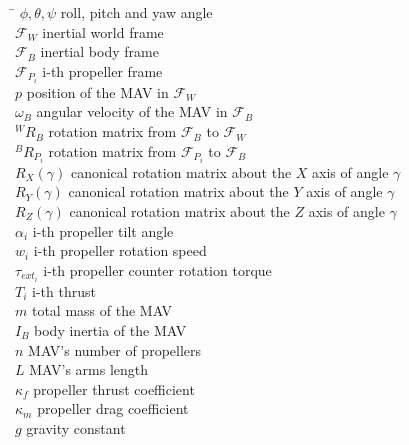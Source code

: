 \begin{tabbing}
 \hspace*{1.6cm} \= \kill
  $\phi, \theta, \psi$    \> roll, pitch and yaw angle \\[0.5ex]
  $\mathcal{F}_{W}$   \> inertial world frame \\[0.5ex]
  $\mathcal{F}_{B}$   \> inertial body frame \\[0.5ex]
  $\mathcal{F}_{P_{i}}$   \> i-th propeller frame \\[0.5ex]
  $p$   \> position of the MAV in $\mathcal{F}_{W}$ \\[0.5ex]
  $\omega_{B}$    \> angular velocity of the MAV in $\mathcal{F}_{B}$\\[0.5ex]
  $^{W}R_{B}$   \> rotation matrix from $\mathcal{F}_{B}$ to $\mathcal{F}_{W}$\\[0.5ex]
  $^{B}R_{P_{i}}$  \> rotation matrix from $\mathcal{F}_{P_{i}}$ to $\mathcal{F}_{B}$\\[0.5ex]
  $R_{X}(\gamma)$   \> canonical rotation matrix about the $X$ axis of angle $\gamma$\\[0.5ex]
  $R_{Y}(\gamma)$   \> canonical rotation matrix about the $Y$ axis of angle $\gamma$\\[0.5ex]
  $R_{Z}(\gamma)$   \> canonical rotation matrix about the $Z$ axis of angle $\gamma$\\[0.5ex]
  $\alpha_{i}$    \> i-th propeller tilt angle\\[0.5ex]
  $w_{i}$    \> i-th propeller rotation speed\\[0.5ex]
  $\tau_{ext_{i}}$    \> i-th propeller counter rotation torque\\[0.5ex]
  $T_{i}$    \> i-th thrust\\[0.5ex]
  $m$    \> total mass of the MAV\\[0.5ex]
  $I_{B}$    \> body inertia of the MAV\\[0.5ex]
  $n$    \> MAV's number of propellers\\[0.5ex]
  $L$    \> MAV's arms length\\[0.5ex]
  $\kappa_{f}$    \> propeller thrust coefficient\\[0.5ex]
  $\kappa_{m}$    \> propeller drag coefficient\\[0.5ex]
  $g$    \> gravity constant\\[0.5ex]
\end{tabbing}



